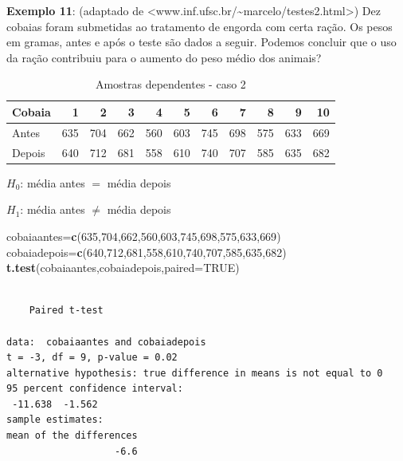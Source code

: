 \documentclass[12pt,brazil,oneside]{book}
\newenvironment{Shaded}{\begin{snugshade}}{\end{snugshade}}
\newcommand{\DataTypeTok}[1]{\textcolor[rgb]{0.13,0.29,0.53}{#1}}
\newcommand{\DecValTok}[1]{\textcolor[rgb]{0.00,0.00,0.81}{#1}}
\newcommand{\KeywordTok}[1]{\textcolor[rgb]{0.13,0.29,0.53}{\textbf{#1}}}
\newcommand{\NormalTok}[1]{#1}
\newcommand{\OtherTok}[1]{\textcolor[rgb]{0.56,0.35,0.01}{#1}}
\begin{document}
\textbf{Exemplo 11}: (adaptado de \textless{}www.inf.ufsc.br/\textasciitilde{}marcelo/testes2.html\textgreater{}) Dez cobaias foram submetidas ao tratamento de engorda com certa ração. Os pesos em gramas, antes e após o teste são dados a seguir. Podemos concluir que o uso da ração contribuiu para o aumento do peso médio dos animais?

\begin{table}[t]

\caption{\label{tab:unnamed-chunk-119}Amostras dependentes - caso 2}
\centering
\begin{tabular}{l|r|r|r|r|r|r|r|r|r|r}
\hline
Cobaia & 1 & 2 & 3 & 4 & 5 & 6 & 7 & 8 & 9 & 10\\
\hline
Antes & 635 & 704 & 662 & 560 & 603 & 745 & 698 & 575 & 633 & 669\\
\hline
Depois & 640 & 712 & 681 & 558 & 610 & 740 & 707 & 585 & 635 & 682\\
\hline
\end{tabular}
\end{table}

\textbf{\(H_0\)}: média antes \(=\) média depois

\textbf{\(H_1\)}: média antes \(\neq\) média depois

\begin{Shaded}
\begin{Highlighting}[]
\NormalTok{cobaiaantes=}\KeywordTok{c}\NormalTok{(}\DecValTok{635}\NormalTok{,}\DecValTok{704}\NormalTok{,}\DecValTok{662}\NormalTok{,}\DecValTok{560}\NormalTok{,}\DecValTok{603}\NormalTok{,}\DecValTok{745}\NormalTok{,}\DecValTok{698}\NormalTok{,}\DecValTok{575}\NormalTok{,}\DecValTok{633}\NormalTok{,}\DecValTok{669}\NormalTok{)}
\NormalTok{cobaiadepois=}\KeywordTok{c}\NormalTok{(}\DecValTok{640}\NormalTok{,}\DecValTok{712}\NormalTok{,}\DecValTok{681}\NormalTok{,}\DecValTok{558}\NormalTok{,}\DecValTok{610}\NormalTok{,}\DecValTok{740}\NormalTok{,}\DecValTok{707}\NormalTok{,}\DecValTok{585}\NormalTok{,}\DecValTok{635}\NormalTok{,}\DecValTok{682}\NormalTok{)}
\KeywordTok{t.test}\NormalTok{(cobaiaantes,cobaiadepois,}\DataTypeTok{paired=}\OtherTok{TRUE}\NormalTok{)}
\end{Highlighting}
\end{Shaded}

\begin{verbatim}

    Paired t-test

data:  cobaiaantes and cobaiadepois
t = -3, df = 9, p-value = 0.02
alternative hypothesis: true difference in means is not equal to 0
95 percent confidence interval:
 -11.638  -1.562
sample estimates:
mean of the differences 
                   -6.6 
\end{verbatim}
\end{document}
